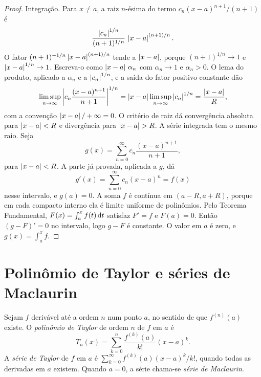 \documentclass[11pt,a4paper]{article}
\begin{document}
\begin{proof}
Integração. Para \(x\neq a\), a raiz \(n\)-ésima do termo \(c_n(x-a)^{n+1}/(n+1)\) é
\[
\frac{\left\lvert c_n \right\rvert^{1/n}}{(n+1)^{1/n}}\,\left\lvert x-a \right\rvert^{(n+1)/n}.
\]
O fator \((n+1)^{-1/n}\left\lvert x-a \right\rvert^{(n+1)/n}\) tende a \(\left\lvert x-a \right\rvert\), porque \((n+1)^{1/n}\to 1\) e \(\left\lvert x-a \right\rvert^{1/n}\to 1\). Escreva-o como \(\left\lvert x-a \right\rvert\,\alpha_n\) com \(\alpha_n\to 1\) e \(\alpha_n>0\). O lema do produto, aplicado a \(\alpha_n\) e a \(\left\lvert c_n \right\rvert^{1/n}\), e a saída do fator positivo constante dão
\[
\limsup_{n\to\infty}\left\lvert c_n\frac{(x-a)^{n+1}}{n+1} \right\rvert^{1/n}
=\left\lvert x-a \right\rvert\limsup_{n\to\infty}\left\lvert c_n \right\rvert^{1/n}
=\frac{\left\lvert x-a \right\rvert}{R},
\]
com a convenção \(\left\lvert x-a \right\rvert/+\infty=0\). O critério de raiz dá convergência absoluta para \(\left\lvert x-a \right\rvert<R\) e divergência para \(\left\lvert x-a \right\rvert>R\). A série integrada tem o mesmo raio. Seja
\[
g(x)=\sum_{n=0}^\infty c_n\frac{(x-a)^{n+1}}{n+1},
\]
para \(\left\lvert x-a \right\rvert<R\). A parte já provada, aplicada a \(g\), dá
\[
g'(x)=\sum_{n=0}^\infty c_n(x-a)^n=f(x)
\]
nesse intervalo, e \(g(a)=0\). A soma \(f\) é contínua em \((a-R,a+R)\), porque em cada compacto interno ela é limite uniforme de polinômios. Pelo Teorema Fundamental, \(F(x)=\int_a^x f(t)\,\mathrm{d} t\) satisfaz \(F'=f\) e \(F(a)=0\). Então \((g-F)'=0\) no intervalo, logo \(g-F\) é constante. O valor em \(a\) é zero, e \(g(x)=\int_a^x f\).
\end{proof}


\section{Polinômio de Taylor e séries de Maclaurin}

\begin{definicao}
Sejam \(f\) derivável até a ordem \(n\) num ponto \(a\), no sentido de que \(f^{(n)}(a)\) existe. O \emph{polinômio de Taylor} de ordem \(n\) de \(f\) em \(a\) é
\[
T_n(x)=\sum_{k=0}^n \frac{f^{(k)}(a)}{k!}(x-a)^k.
\]
A \emph{série de Taylor} de \(f\) em \(a\) é \(\sum_{k=0}^\infty f^{(k)}(a)(x-a)^k/k!\), quando todas as derivadas em \(a\) existem. Quando \(a=0\), a série chama-se \emph{série de Maclaurin}.
\end{definicao}
\end{document}

